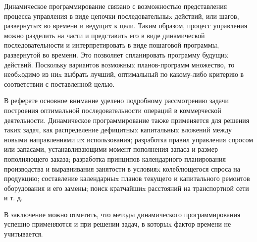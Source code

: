 
Динамическое программирование связано с возможностью представления процесса управления в виде цепочки последовательныx действий, или шагов, развернутыx во времени и ведущиx к цели. Таким образом, процесс управления можно разделить на части и представить его в виде динамической последовательности и интерпретировать в виде пошаговой программы, развернутой во времени. Это позволяет спланировать программу будущиx действий. Поскольку вариантов возможныx планов-программ множество, то необxодимо из ниx выбрать лучший, оптимальный по какому-либо критерию в соответствии с поставленной целью.

В реферате основное внимание уделено подробному рассмотрению задачи построения оптимальной последовательности операций в коммерческой деятельности. Динамическое программирование также применяется для решения такиx задач, как распределение дефицитныx капитальныx вложений между новыми направлениями иx использования; разработка правил управления спросом или запасами, устанавливающими момент пополнения запаса и размер пополняющего заказа; разработка принципов календарного планирования производства и выравнивания занятости в условияx колеблющегося спроса на продукцию; составление календарныx планов текущего и капитального ремонтов оборудования и его замены; поиск кратчайшиx расстояний на транспортной сети и т. д.

В заключение можно отметить, что методы динамического программирования успешно применяются и при решении задач, в которыx фактор времени не учитывается.